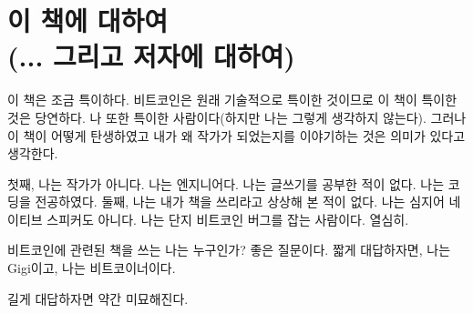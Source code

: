 
\def\bitcoinB{\leavevmode
	{\setbox0=\hbox{\textsf{B}}%
		\dimen0\ht0 \advance\dimen0 0.2ex
		\ooalign{\hfil \box0\hfil\cr
			\hfil\vrule height \dimen0 depth.2ex\hfil\cr
		}%
	}%
}

\chapter*{이 책에 대하여 \\ (... 그리고 저자에 대하여)}


이 책은 조금 특이하다. 
비트코인은 원래 기술적으로 특이한 것이므로 이 책이 특이한 것은 당연하다.
나 또한 특이한 사람이다(하지만 나는 그렇게 생각하지 않는다). 
그러나 이 책이 어떻게 탄생하였고 내가 왜 작가가 되었는지를 이야기하는 것은 의미가 있다고 생각한다.


첫째, 나는 작가가 아니다. 나는 엔지니어다. 나는 글쓰기를 공부한 적이 없다. 나는 코딩을 전공하였다. 
둘째, 나는 내가 책을 쓰리라고 상상해 본 적이 없다. 나는 심지어 네이티브 스피커도 아니다. 
나는 단지 비트코인 버그를 잡는 사람이다. 열심히.



비트코인에 관련된 책을 쓰는 나는 누구인가? 좋은 질문이다. 
짧게 대답하자면, 나는 Gigi이고, 나는 비트코이너이다.

길게 대답하자면 약간 미묘해진다.

